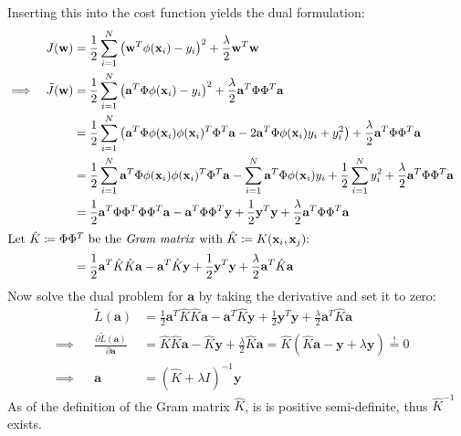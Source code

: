\documentclass[a4paper, 11pt, accentcolor = tud3b]{tudreport}
\renewcommand{\vec}[1]{\mathbf{#1}}
\begin{document}
				Inserting this into the cost function yields the dual formulation:
				\begin{align}
					&& J(\vec{w}) &= \frac{1}{2} \sum_{i = 1}^{N} \big( \vec{w}^T \phi(\vec{x}_i) - y_i \big)^2 + \frac{\lambda}{2} \vec{w}^T \vec{w} & \\
					\implies && \tilde{J}(\vec{w}) &= \frac{1}{2} \sum_{i = 1}^{N} \big( \vec{a}^T \Phi \phi(\vec{x}_i) - y_i \big)^2 + \frac{\lambda}{2} \vec{a}^T \Phi \Phi^T \vec{a} & \\
						&& &= \frac{1}{2} \sum_{i = 1}^{N} \big( \vec{a}^T \Phi \phi(\vec{x}_i) \phi(\vec{x}_i)^T \Phi^T \vec{a} - 2 \vec{a}^T \Phi \phi(\vec{x}_i)y_i + y_i^2 \big) + \frac{\lambda}{2} \vec{a}^T \Phi \Phi^T \vec{a} & \\
						&& &= \frac{1}{2} \sum_{i = 1}^{N} \vec{a}^T \Phi \phi(\vec{x}_i) \phi(\vec{x}_i)^T \Phi^T \vec{a} - \sum_{i = 1}^{N} \vec{a}^T \Phi \phi(\vec{x}_i)y_i + \frac{1}{2} \sum_{i = 1}^{N} y_i^2 + \frac{\lambda}{2} \vec{a}^T \Phi \Phi^T \vec{a} & \\
						&& &= \frac{1}{2} \vec{a}^T \Phi \Phi^T \Phi \Phi^T \vec{a} - \vec{a}^T \Phi \Phi^T \vec{y} + \frac{1}{2} \vec{y}^T \vec{y} + \frac{\lambda}{2} \vec{a}^T \Phi \Phi^T \vec{a} & \\
					\intertext{Let \( \hat{K} \coloneqq \Phi\Phi^T \) be the \emph{Gram matrix} with \( \hat{K} \coloneqq K(\vec{x}_i, \vec{x}_j) \):}
					&& &= \frac{1}{2} \vec{a}^T \hat{K} \hat{K} \vec{a} - \vec{a}^T \hat{K} \vec{y} + \frac{1}{2} \vec{y}^T \vec{y} + \frac{\lambda}{2} \vec{a}^T \hat{K} \vec{a} & \\
				\end{align}
				Now solve the dual problem for \(\vec{a}\) by taking the derivative and set it to zero:
				\begin{align}
					&& \tilde{L}(\vec{a}) &= \frac{1}{2} \vec{a}^T \hat{K} \hat{K} \vec{a} - \vec{a}^T \hat{K} \vec{y} + \frac{1}{2} \vec{y}^T \vec{y} + \frac{\lambda}{2} \vec{a}^T \hat{K} \vec{a} & \\
					\implies && \frac{\partial \tilde{L}(\vec{a})}{\partial \vec{a}} &= \hat{K} \hat{K} \vec{a} - \hat{K} \vec{y} + \frac{\lambda}{2} \hat{K} \vec{a} = \hat{K} (\hat{K}\vec{a} - \vec{y} + \lambda\vec{y}) \overset{!}{=} 0 & \\
					\implies && \vec{a} &= (\hat{K} + \lambda I)^{-1} \vec{y}
				\end{align}
				As of the definition of the Gram matrix \(\hat{K}\), is is positive semi-definite, thus \(\hat{K}^{-1}\) exists.
				
\end{document}
